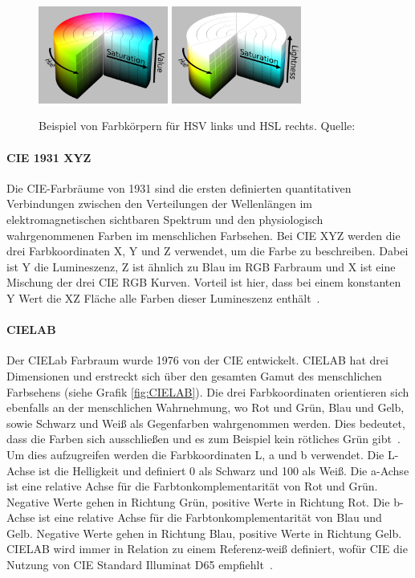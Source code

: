 \documentclass[12pt, a4paper, ngerman]{article}
\begin{document}
\begin{figure}
  \centering
  \includegraphics[width=0.38\textwidth]{Grafiken/HSV_Zylinder.png}
  \includegraphics[width=0.38\textwidth]{Grafiken/HSL_Zylinder.png}
  \caption{Beispiel von Farbkörpern für HSV links und HSL rechts. Quelle:~\cite{HSL_and_HSV_2023}}
  \label{fig:HSV_HSL}
\end{figure}

\paragraph{CIE 1931 XYZ}
Die \acs{CIE}-Farbräume von 1931 sind die ersten definierten quantitativen Verbindungen zwischen den Verteilungen 
der Wellenlängen im elektromagnetischen sichtbaren Spektrum und den physiologisch wahrgenommenen Farben im menschlichen Farbsehen. 
Bei CIE XYZ werden die drei Farbkoordinaten X, Y und Z verwendet, um die Farbe zu beschreiben.
Dabei ist Y die Lumineszenz, Z ist ähnlich zu Blau im RGB Farbraum und X ist eine Mischung der drei CIE RGB Kurven.
Vorteil ist hier, dass bei einem konstanten Y Wert die XZ Fläche alle Farben dieser Lumineszenz enthält~\cite{CIE_1931_color_space_2023}.

\paragraph{CIELAB}
Der CIE\acs{Lab} Farbraum wurde 1976 von der CIE entwickelt.
CIELAB hat drei Dimensionen und erstreckt sich über den gesamten Gamut des menschlichen Farbsehens (siehe Grafik \ref{fig:CIELAB}).
Die drei Farbkoordinaten orientieren sich ebenfalls an der menschlichen Wahrnehmung, 
wo Rot und Grün, Blau und Gelb, sowie Schwarz und Weiß als Gegenfarben wahrgenommen werden.
Dies bedeutet, dass die Farben sich ausschließen und es zum Beispiel kein rötliches Grün gibt~\cite{Becker-Carus_Wendt_2017}.
Um dies aufzugreifen werden die Farbkoordinaten L, a und b verwendet.
Die L-Achse ist die Helligkeit und definiert 0 als Schwarz und 100 als Weiß.
Die a-Achse ist eine relative Achse für die Farbtonkomplementarität von Rot und Grün.
Negative Werte gehen in Richtung Grün, positive Werte in Richtung Rot.
Die b-Achse ist eine relative Achse für die Farbtonkomplementarität von Blau und Gelb.
Negative Werte gehen in Richtung Blau, positive Werte in Richtung Gelb.
CIELAB wird immer in Relation zu einem Referenz-weiß definiert, 
wofür CIE die Nutzung von CIE Standard Illuminat D65 empfiehlt~\cite{CIELAB_color_space_2023}.
\end{document}
